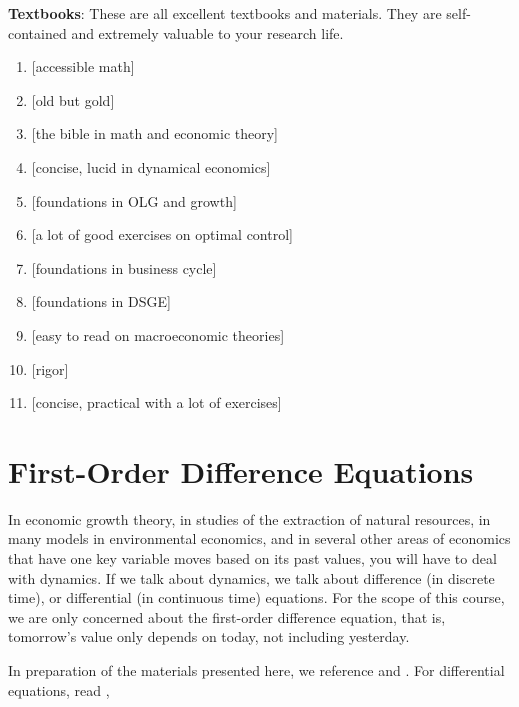 \documentclass[11pt,a4paper]{book}
\theoremstyle{definition}\newtheorem{definition}{Definition}
\theoremstyle{definition}\newtheorem{fact}{Fact}
\theoremstyle{definition}\newtheorem{remark}{Remark}
\theoremstyle{definition}\newtheorem{ex}{Ex.}
\theoremstyle{definition}\newtheorem{project}{Project}
\theoremstyle{definition}\newtheorem{problem}{Problem}
\theoremstyle{definition}\newtheorem{example}{Example}
\numberwithin{theorem}{section}
\numberwithin{corollary}{chapter}
\numberwithin{assumption}{chapter}
\numberwithin{definition}{chapter}
\numberwithin{prop}{chapter}
\numberwithin{notation}{chapter}
\numberwithin{problem}{chapter}
\numberwithin{example}{chapter}
\numberwithin{fact}{chapter}
\numberwithin{ex}{chapter}
\begin{document}
	\textbf{Textbooks}: These are all excellent textbooks and materials. They are self-contained and extremely valuable to your research life.
	
	\begin{enumerate}
		\item \citet{sydsaeter2008essential, sydsaeter2008further} [accessible math]
		\item \citet{chiang1984fundamental, chiang1992element} [old but gold]
		\item \citet{simon1994mathematics} [the bible in math and economic theory]
		\item \citet{shone2002economic} [concise, lucid in dynamical economics]
		\item \citet{de2002theory} [foundations in OLG and growth]
		\item \citet{chu2021advanced} [a lot of good exercises on optimal control]
		\item \citet{mccandless2008abcs} [foundations in business cycle]
		\item \citet{heer2009dynamic} [foundations in DSGE]
		\item \citet{campante2021advanced} [easy to read on macroeconomic theories]
		\item \citet{acemoglu2008introduction} [rigor]
		\item \citet{michaillat2023} [concise, practical with a lot of exercises]
	\end{enumerate}
	
	
	
	\chapter{First-Order Difference Equations}
	In economic growth theory, in studies of the extraction of natural resources, in many models in environmental economics, and in several other areas of economics that have one key variable moves based on its past values, you will have to deal with dynamics. If we talk about dynamics, we talk about difference (in discrete time), or differential (in continuous time) equations. For the scope of this course, we are only concerned about the first-order difference equation, that is, tomorrow's value only depends on today, not including yesterday. 
	
	In preparation of the materials presented here, we reference  \citet{sydsaeter2008essential, sydsaeter2008further} and \citet[p.616]{chiang1984fundamental}. For differential equations, read \citet[Chapter 5, 6]{sydsaeter2008further}, \citet[Chapter 23,24,25]{simon1994mathematics}
	
\end{document}
